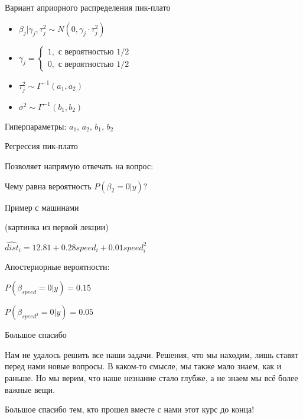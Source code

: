 \documentclass[ignorenonframetext,]{beamer}
\begin{document}
\begin{frame}{Вариант априорного распределения пик-плато}

\begin{itemize}
\item
  \(\beta_j | \gamma_j, \tau^2_j \sim N(0, \gamma_j \cdot \tau^2_j )\)
\item
  \(\gamma_j = \begin{cases} 1, \text{ с вероятностью } 1/2 \\ 0, \text{ с вероятностью } 1/2 \end{cases}\)
\item
  \(\tau_j^2 \sim \Gamma^{-1}(a_1,a_2)\)
\item
  \(\sigma^2 \sim \Gamma^{-1}(b_1,b_2)\)
\end{itemize}

Гиперпараметры: \(a_1\), \(a_2\), \(b_1\), \(b_2\)

\end{frame}

\begin{frame}{Регрессия пик-плато}

Позволяет напрямую отвечать на вопрос:

Чему равна вероятность \(P(\beta_2 = 0 | y)\)?

\end{frame}

\begin{frame}{Пример с машинами}

(картинка из первой лекции)

\(\widehat{dist}_i = 12.81 + 0.28 speed_i + 0.01 speed_i^2\)

Апостериорные вероятности:

\(P(\beta_{speed}=0 | y )=0.15\)

\(P(\beta_{speed^2}=0 | y )=0.05\)

\end{frame}

\begin{frame}{Большое спасибо}

Нам не удалось решить все наши задачи. Решения, что мы находим, лишь
ставят перед нами новые вопросы. В каком-то смысле, мы также мало знаем,
как и раньше. Но мы верим, что наше незнание стало глубже, а не знаем мы
всё более важные вещи.

Большое спасибо тем, кто прошел вместе с нами этот курс до конца!

\end{frame}
\end{document}
